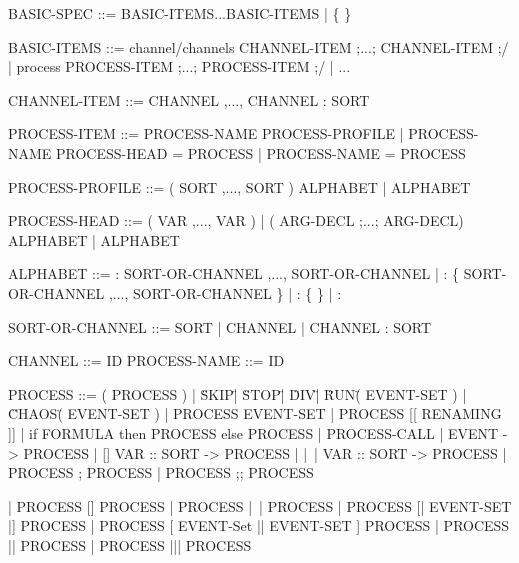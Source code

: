 BASIC-SPEC      ::= BASIC-ITEMS...BASIC-ITEMS  |  \{ \}

BASIC-ITEMS     ::= channel/channels CHANNEL-ITEM ;...; CHANNEL-ITEM ;/
                  | process PROCESS-ITEM ;...; PROCESS-ITEM ;/
                  | ...

CHANNEL-ITEM    ::= CHANNEL ,..., CHANNEL : SORT

PROCESS-ITEM    ::= PROCESS-NAME PROCESS-PROFILE    %
                  | PROCESS-NAME PROCESS-HEAD = PROCESS
                  | PROCESS-NAME = PROCESS

PROCESS-PROFILE ::= ( SORT ,..., SORT ) ALPHABET
                  | ALPHABET

PROCESS-HEAD    ::= ( VAR ,..., VAR )              %
                  | ( ARG-DECL ;...; ARG-DECL) ALPHABET
                  | ALPHABET

ALPHABET        ::= : SORT-OR-CHANNEL ,..., SORT-OR-CHANNEL
                  | : \{ SORT-OR-CHANNEL ,..., SORT-OR-CHANNEL \}
                  | : \{ \}   %
                  | :         %

SORT-OR-CHANNEL ::= SORT
                  | CHANNEL
                  | CHANNEL : SORT

CHANNEL         ::= ID
PROCESS-NAME    ::= ID

PROCESS ::=   ( PROCESS )                   %
            | \"SKIP\"
            | \"STOP\"
            | \"DIV\"
            | \"RUN\" ( EVENT-SET )
            | \"CHAOS\" ( EVENT-SET )
            | PROCESS \back EVENT-SET       %
            | PROCESS [[ RENAMING ]]
            | if FORMULA then PROCESS else PROCESS
            | PROCESS-CALL
            | EVENT -> PROCESS
            | [] VAR :: SORT -> PROCESS    %
            | |~| VAR :: SORT -> PROCESS
            | PROCESS ; PROCESS
            | PROCESS ;; PROCESS %

            | PROCESS [] PROCESS
            | PROCESS |~| PROCESS
            | PROCESS [| EVENT-SET |] PROCESS
            | PROCESS [ EVENT-Set || EVENT-SET ] PROCESS
            | PROCESS || PROCESS
            | PROCESS ||| PROCESS


